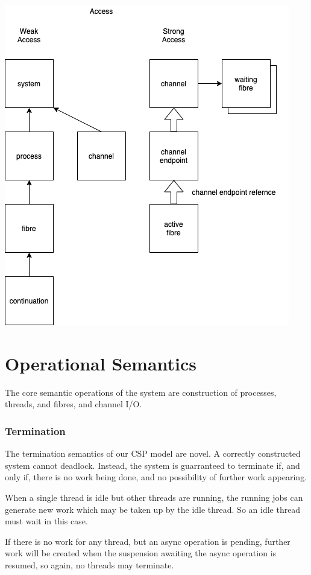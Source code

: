 \documentclass[oneside]{book}
\begin{document}
\includegraphics{../src/tex/weak_access.png}

\chapter{Operational Semantics}
The core semantic operations of the system are construction of
processes, threads, and fibres, and channel I/O.

\subsection{Termination}
The termination semantics of our CSP model are novel. A correctly constructed
system cannot deadlock. Instead, the system is guarranteed
to terminate if, and only if, there is no work being done, and no possibility
of further work appearing.

When a single thread is idle but other threads are running, the running jobs
can generate new work which may be taken up by the idle thread. So an idle
thread must wait in this case.

If there is no work for any thread, but an async operation is pending,
further work will be created when the suspension awaiting the async
operation is resumed, so again, no threads may terminate.
\end{document}

